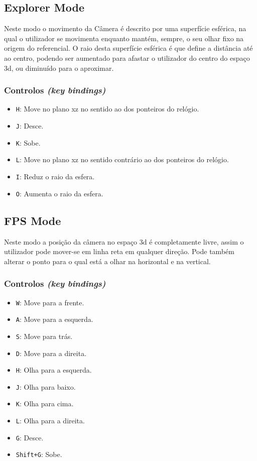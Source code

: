 \documentclass[a4paper]{article}
\begin{document}
\subsection{Explorer Mode}

Neste modo o movimento da Câmera é descrito por uma superfície esférica, na qual o utilizador se movimenta enquanto mantém, sempre, o seu olhar fixo na origem do referencial. O raio desta superfície esférica é que define a distância até ao centro, podendo ser aumentado para afastar o utilizador do centro do espaço 3d, ou diminuído para o aproximar.

\subsubsection{Controlos \textit{(key bindings)}}

\begin{itemize}
    \item \texttt{H}: Move no plano xz no sentido ao dos ponteiros do relógio.
    \item \texttt{J}: Desce.
    \item \texttt{K}: Sobe.
    \item \texttt{L}: Move no plano xz no sentido contrário ao dos ponteiros do relógio.
    \item \texttt{I}: Reduz o raio da esfera.
    \item \texttt{O}: Aumenta o raio da esfera.
\end{itemize}

\subsection{FPS Mode}

Neste modo a posição da câmera no espaço 3d é completamente livre, assim o utilizador pode mover-se em linha reta em qualquer direção. Pode também alterar o ponto para o qual está a olhar na horizontal e na vertical.

\subsubsection{Controlos \textit{(key bindings)}}

\begin{itemize}
    \item \texttt{W}: Move para a frente.
    \item \texttt{A}: Move para a esquerda.
    \item \texttt{S}: Move para trás.
    \item \texttt{D}: Move para a direita.
    \item \texttt{H}: Olha para a esquerda.
    \item \texttt{J}: Olha para baixo.
    \item \texttt{K}: Olha para cima.
    \item \texttt{L}: Olha para a direita.
    \item \texttt{G}: Desce.
    \item \texttt{Shift+G}: Sobe.
\end{itemize}
\end{document}
